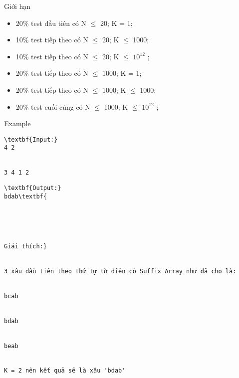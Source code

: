 Giới hạn
\begin{itemize}
	\item     20\% test đầu tiên có N  $\le$  20; K = 1;   
	\item     10\% test tiếp theo có N  $\le$  20; K  $\le$  1000;   
	\item     10\% test tiếp theo có N  $\le$  20; K  $\le$  $10^{12}$    ;   
	\item     20\% test tiếp theo có N  $\le$  1000; K = 1;   
	\item     20\% test tiếp theo có N  $\le$  1000; K  $\le$ 1000;   
	\item     20\% test cuối cùng có N  $\le$  1000; K  $\le$  $10^{12}$    ;   
\end{itemize}
Example
\begin{verbatim}
\textbf{Input:}
4 2


3 4 1 2\end{verbatim}
\begin{verbatim}
\textbf{Output:}
bdab\textbf{





Giải thích:}


3 xâu đầu tiên theo thứ tự từ điển có Suffix Array như đã cho là:


bcab


bdab


beab


K = 2 nên kết quả sẽ là xâu 'bdab' \end{verbatim}